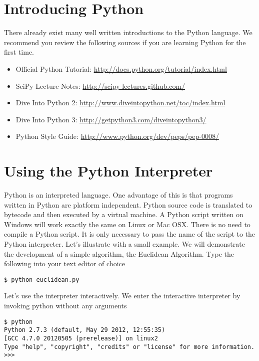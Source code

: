 \section*{Introducing Python}
There already exist many well written introductions to the Python language.  We recommend you review the following sources if you are learning Python for the first time.

\begin{itemize}
\item Official Python Tutorial: \url{http://docs.python.org/tutorial/index.html}
\item SciPy Lecture Notes: \url{http://scipy-lectures.github.com/}
\item Dive Into Python 2: \url{http://www.diveintopython.net/toc/index.html}
\item Dive Into Python 3: \url{http://getpython3.com/diveintopython3/}
\item Python Style Guide: \url{http://www.python.org/dev/peps/pep-0008/}
\end{itemize}

\section*{Using the Python Interpreter}
Python is an interpreted language.  One advantage of this is that programs written in Python are platform independent.  Python source code is translated to bytecode and then executed by a virtual machine.  A Python script written on Windows will work exactly the same on Linux or Mac OSX.  There is no need to compile a Python script.  It is only necessary to pass the name of the script to the Python interpreter.  Let's illustrate with a small example.  We will demonstrate the development of a simple algorithm, the Euclidean Algorithm.  Type the following into your text editor of choice


\begin{lstlisting}
$ python euclidean.py
\end{lstlisting}

Let's use the interpreter interactively.  We enter the interactive interpreter by invoking python without any arguments
\begin{lstlisting}
$ python
Python 2.7.3 (default, May 29 2012, 12:55:35) 
[GCC 4.7.0 20120505 (prerelease)] on linux2
Type "help", "copyright", "credits" or "license" for more information.
>>> 
\end{lstlisting}


